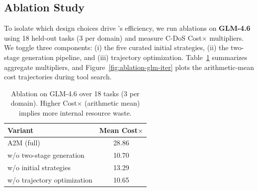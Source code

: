 \subsection{Ablation Study}

To isolate which design choices
drive \methodname{}'s efficiency,
we run ablations on \textbf{GLM-4.6}
using 18 held-out tasks (3 per domain)
and measure C-DoS Cost$\times$ multipliers.
We toggle three components:
(i) the five curated initial strategies,
(ii) the two-stage generation pipeline,
and (iii) trajectory optimization.
Table~\ref{tab:ablation-glm-summary}
summarizes aggregate multipliers,
and Figure~\ref{fig:ablation-glm-iter}
plots the arithmetic-mean cost trajectories
during tool search.
\begin{table}[t]
    \centering
    \normalsize
    \setlength{\tabcolsep}{4pt}
    \begin{tabular}{@{}lc@{}}
        \toprule
        \textbf{Variant} & \textbf{Mean Cost$\times$} \\
        \midrule
        A2M (full) & 28.86 \\
        w/o two-stage generation
            & 10.70 \\
        w/o initial strategies & 13.29 \\
        w/o trajectory optimization & 10.65 \\
        \bottomrule
    \end{tabular}
    \caption{%
        Ablation on GLM-4.6 over 18 tasks (3 per domain).
        Higher Cost$\times$ (arithmetic mean)
        implies more internal resource waste.
    }\label{tab:ablation-glm-summary}
\end{table}

